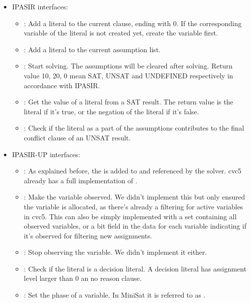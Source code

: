 \begin{itemize}
  \item IPASIR interfaces:
  \begin{itemize}
    \item {}: Add a literal to the current clause, ending with 0. If the corresponding variable of the literal is not created yet, create the variable first.
    \item {}: Add a literal to the current assumption list.
    \item {}: Start solving. The assumptions will be cleared after solving. Return value 10, 20, 0 mean SAT, UNSAT and UNDEFINED respectively in accordance with IPASIR.
    \item {}: Get the value of a literal from a SAT result. The return value is the literal if it's true, or the negation of the literal if it's false.
    \item {}: Check if the literal as a part of the assumptions contributes to the final conflict clause of an UNSAT result.
  \end{itemize}
  \item IPASIR-UP interfaces:
  \begin{itemize}
    \item {}: As explained before, the  is added to and referenced by the solver. cvc5 already has a full implementation of .
    \item {}: Make the variable observed. We didn't implement this but only ensured the variable is allocated, as there's already a filtering for active variables in cvc5. This can also be simply implemented with a set containing all observed variables, or a bit field in the data for each variable indicating if it's observed for filtering new assignments.
    \item {}: Stop observing the variable. We didn't implement it either.
    \item {}: Check if the literal is a decision literal. A decision literal has assignment level larger than 0 an no reason clause.
    \item {}: Set the phase of a variable. In MiniSat it is referred to as .
  \end{itemize}

\end{itemize}
